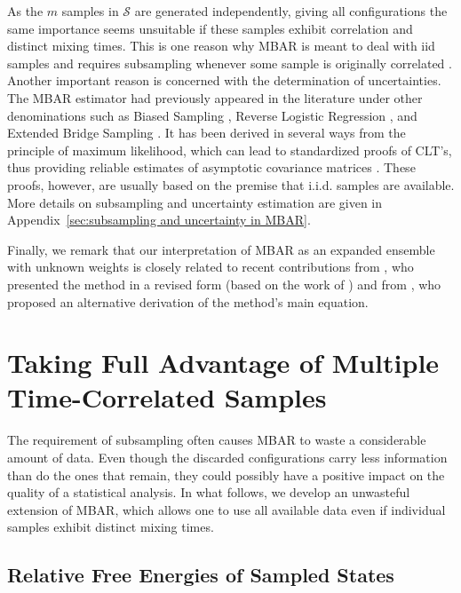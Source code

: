 \documentclass[journal=jctcce,manuscript=article,layout=twocolumn]{achemso}
\begin{document}
As the $m$ samples in $\mathcal S$ are generated independently, giving all configurations the same importance seems unsuitable if these samples exhibit correlation and distinct mixing times. This is one reason why MBAR is meant to deal with iid samples and requires subsampling whenever some sample is originally correlated \cite{Shirts_2008}. Another important reason is concerned with the determination of uncertainties. The MBAR estimator had previously appeared in the literature under other denominations such as Biased Sampling \cite{Vardi_1985, Gill_1988}, Reverse Logistic Regression \cite{Geyer_1994}, and Extended Bridge Sampling \cite{Meng_1996, Kong_2003, Tan_2004}. It has been derived in several ways from the principle of maximum likelihood, which can lead to standardized proofs of CLT's, thus providing reliable estimates of asymptotic covariance matrices \cite{Pawitan_2001, Greene_2012}. These proofs, however, are usually based on the premise that i.i.d. samples are available. More details on subsampling and uncertainty estimation are given in Appendix~\ref{sec:subsampling and uncertainty in MBAR}.

Finally, we remark that our interpretation of MBAR as an expanded ensemble with unknown weights is closely related to recent contributions from \citeauthor{Shirts_2017} \cite{Shirts_2017}, who presented the method in a revised form (based on the work of \citeauthor{Geyer_1994} \cite{Geyer_1994}) and from \citeauthor{Ding_2017} \cite{Ding_2017}, who proposed an alternative derivation of the method's main equation.

\section{Taking Full Advantage of Multiple Time-Correlated Samples}

The requirement of subsampling often causes MBAR to waste a considerable amount of data. Even though the discarded configurations carry less information than do the ones that remain, they could possibly have a positive impact on the quality of a statistical analysis. In what follows, we develop an unwasteful extension of MBAR, which allows one to use all available data even if individual samples exhibit distinct mixing times.

\subsection{Relative Free Energies of Sampled States}
\end{document}
